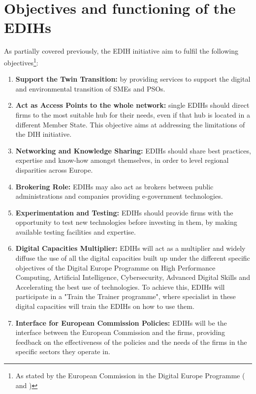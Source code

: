 \documentclass[12pt]{report}
\begin{document}
\section{Objectives and functioning of the EDIHs}

\par As partially covered previously, the EDIH initiative aim to fulfil the following objectives\footnote{As stated by the European Commission in the Digital Europe Programme (\cite{digital_europe_programme} and \cite{digital_europe_edih_wp_2021_2023})}:
\begin{enumerate}
    \item \textbf{Support the Twin Transition:} by providing services to support the digital and environmental transition of SMEs and PSOs.
    \item \textbf{Act as Access Points to the whole network:} single EDIHs should direct firms to the most suitable hub for their needs, even if that hub is located in a different Member State. This objective aims at addressing the limitations of the DIH initiative. 
    \item \textbf{Networking and Knowledge Sharing:} EDIHs should share best practices, expertise and know-how amongst themselves, in order to level regional disparities across Europe.
    \item \textbf{Brokering Role:} EDIHs may also act as brokers between public administrations and companies providing e-government technologies.
    \item \textbf{Experimentation and Testing:} EDIHs should provide firms with the opportunity to test new technologies before investing in them, by making available testing facilities and expertise.
    \item \textbf{Digital Capacities Multiplier:} EDIHs will act as a multiplier and widely diffuse the use of all the digital capacities built
    up under the different specific objectives of the Digital Europe Programme on High Performance
    Computing, Artificial Intelligence, Cybersecurity, Advanced Digital Skills and Accelerating the best use
    of technologies. To achieve this, EDIHs will participate in a "Train the Trainer programme", where specialist in these digital capacities will train the EDIHs on how to use them.
    \item \textbf{Interface for European Commission Policies:} EDIHs will be the interface between the European Commission and the firms, providing feedback on the effectiveness of the policies and the needs of the firms in the specific sectors they operate in.
\end{enumerate}
\end{document}
